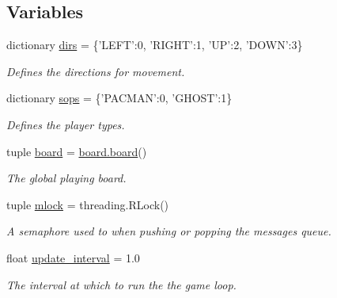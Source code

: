 \subsection*{Variables}
\begin{DoxyCompactItemize}
\item 
\hypertarget{namespacegame_a448ab52c1ad4fb2e2da413ebe0f282b6}{
dictionary \hyperlink{namespacegame_a448ab52c1ad4fb2e2da413ebe0f282b6}{dirs} = \{'LEFT':0, 'RIGHT':1, 'UP':2, 'DOWN':3\}}
\label{namespacegame_a448ab52c1ad4fb2e2da413ebe0f282b6}

\begin{DoxyCompactList}\small\item\em Defines the directions for movement. \item\end{DoxyCompactList}\item 
\hypertarget{namespacegame_a3774645aa0514732e4a62fc8e22d95ca}{
dictionary \hyperlink{namespacegame_a3774645aa0514732e4a62fc8e22d95ca}{sops} = \{'PACMAN':0, 'GHOST':1\}}
\label{namespacegame_a3774645aa0514732e4a62fc8e22d95ca}

\begin{DoxyCompactList}\small\item\em Defines the player types. \item\end{DoxyCompactList}\item 
\hypertarget{namespacegame_adf1800c0e5ecfa32e21bd2301d912b14}{
tuple \hyperlink{namespacegame_adf1800c0e5ecfa32e21bd2301d912b14}{board} = \hyperlink{classboard_1_1board}{board.board}()}
\label{namespacegame_adf1800c0e5ecfa32e21bd2301d912b14}

\begin{DoxyCompactList}\small\item\em The global playing board. \item\end{DoxyCompactList}\item 
\hypertarget{namespacegame_aa4d96b074efeeac5472317ba48cd692f}{
tuple \hyperlink{namespacegame_aa4d96b074efeeac5472317ba48cd692f}{mlock} = threading.RLock()}
\label{namespacegame_aa4d96b074efeeac5472317ba48cd692f}

\begin{DoxyCompactList}\small\item\em A semaphore used to when pushing or popping the messages queue. \item\end{DoxyCompactList}\item 
\hypertarget{namespacegame_ace44eb7f816b22c7c99e0e59c13a7884}{
float \hyperlink{namespacegame_ace44eb7f816b22c7c99e0e59c13a7884}{update\_\-interval} = 1.0}
\label{namespacegame_ace44eb7f816b22c7c99e0e59c13a7884}

\begin{DoxyCompactList}\small\item\em The interval at which to run the the game loop. \item\end{DoxyCompactList}\end{DoxyCompactItemize}


